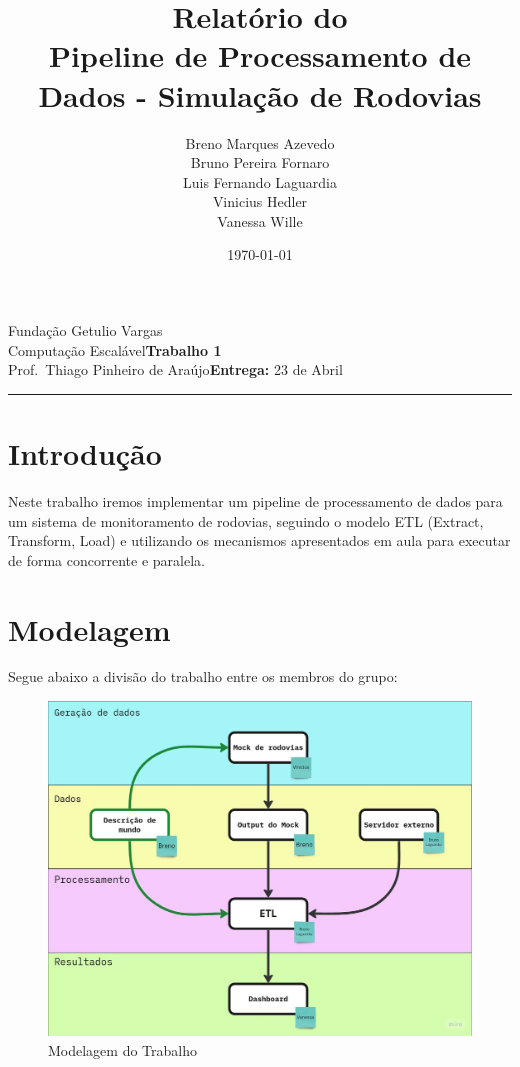 \documentclass{article}
\title{
    Relatório do \assignment \\
    Pipeline de Processamento de Dados - Simulação de Rodovias
}
\author{
    Breno Marques Azevedo \\
    Bruno Pereira Fornaro \\
    Luis Fernando Laguardia \\
    Vinicius Hedler \\
    Vanessa Wille 
}
\date{\today}
\newcommand{\assignment}{Trabalho 1}
\newcommand{\duedate}{23 de Abril}
\begin{document}
    \noindent
    Fundação Getulio Vargas\hfill\\
    Computação Escalável\hfill\textbf{\assignment}\\
    Prof.\ Thiago Pinheiro de Araújo\hfill\textbf{Entrega:} \duedate\\
    \smallskip\hrule\bigskip

    {\let\newpage\relax\maketitle}
    \maketitle

    \section{Introdução}
    Neste trabalho iremos implementar um pipeline de processamento de dados
    para um sistema de monitoramento de rodovias, seguindo o modelo ETL 
    (Extract, Transform, Load) e utilizando os mecanismos apresentados
    em aula para executar de forma concorrente e paralela.

    \section{Modelagem}
    Segue abaixo a divisão do trabalho entre os membros do grupo:
    \begin{figure}[H]
        \centering
        \includegraphics[width=13cm]{figs/modelagem.jpg}
        \caption{Modelagem do Trabalho}
        \label{fig:modelagem}
    \end{figure}
\end{document}
